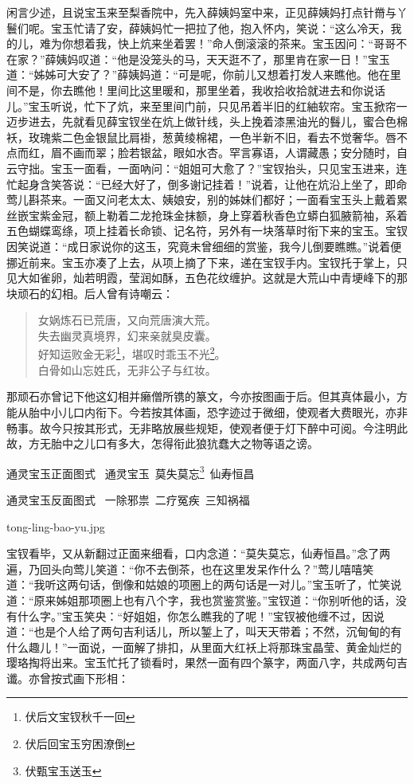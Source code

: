\documentclass[12pt,oneside]{book}
\newenvironment{shici}{%
\begin{verse}%
\centering\large\hspace{12pt}}%
{\end{verse}}
\begin{document}
闲言少述，且说宝玉来至梨香院中，先入薛姨妈室中来，正见薛姨妈打点针黹与丫鬟们呢。宝玉忙请了安，薛姨妈忙一把拉了他，抱入怀内，笑说：“这么冷天，我的儿，难为你想着我，快上炕来坐着罢！”命人倒滚滚的茶来。宝玉因问：“哥哥不在家？”薛姨妈叹道：“他是没笼头的马，天天逛不了，那里肯在家一日！”宝玉道：“姊姊可大安了？”薛姨妈道：“可是呢，你前儿又想着打发人来瞧他。他在里间不是，你去瞧他！里间比这里暖和，那里坐着，我收拾收拾就进去和你说话儿。”宝玉听说，忙下了炕，来至里间门前，只见吊着半旧的红紬软帘。宝玉掀帘一迈步进去，先就看见薛宝钗坐在炕上做针线，头上挽着漆黑油光的䰖儿，蜜合色棉袄，玫瑰紫二色金银鼠比肩褂，葱黄绫棉裙，一色半新不旧，看去不觉奢华。唇不点而红，眉不画而翠；脸若银盆，眼如水杏。罕言寡语，人谓藏愚；安分随时，自云守拙。宝玉一面看，一面吶问：“姐姐可大愈了？”宝钗抬头，只见宝玉进来，连忙起身含笑答说：“已经大好了，倒多谢记挂着！”说着，让他在炕沿上坐了，即命莺儿斟茶来。一面又问老太太、姨娘安，别的姊妹们都好；一面看宝玉头上戴着累丝嵌宝紫金冠，额上勒着二龙抢珠金抹额，身上穿着秋香色立蟒白狐腋箭袖，系着五色蝴蝶鸾绦，项上挂着长命锁、记名符，另外有一块落草时衔下来的宝玉。宝钗因笑说道：“成日家说你的这玉，究竟未曾细细的赏鉴，我今儿倒要瞧瞧。”说着便挪近前来。宝玉亦凑了上去，从项上摘了下来，递在宝钗手内。宝钗托于掌上，只见大如雀卵，灿若明霞，莹润如酥，五色花纹缠护。这就是大荒山中青埂峰下的那块顽石的幻相。后人曾有诗嘲云：

\begin{shici}
女娲炼石已荒唐，又向荒唐演大荒。\\
失去幽灵真境界，幻来亲就臭皮囊。\\
好知运败金无彩\footnote{伏后文宝钗秋千一回}，堪叹时乖玉不光\footnote{伏后回宝玉穷困潦倒}。\\
白骨如山忘姓氏，无非公子与红妆。
\end{shici}


那顽石亦曾记下他这幻相并癞僧所镌的篆文，今亦按图画于后。但其真体最小，方能从胎中小儿口内衔下。今若按其体画，恐字迹过于微细，使观者大费眼光，亦非畅事。故今只按其形式，无非略放展些规矩，使观者便于灯下醉中可阅。今注明此故，方无胎中之儿口有多大，怎得衔此狼犺蠢大之物等语之谤。

通灵宝玉正面图式  ~通灵宝玉~莫失莫忘\footnote{伏甄宝玉送玉}~仙寿恒昌

通灵宝玉反面图式  ~一除邪祟~二疗冤疾~三知祸福
 
\begin{fig}{tong-ling-bao-yu.jpg}
\label{fig:tong-ling-bao-yu}
\end{fig}

宝钗看毕，又从新翻过正面来细看，口内念道：“莫失莫忘，仙寿恒昌。”念了两遍，乃回头向莺儿笑道：“你不去倒茶，也在这里发呆作什么？”莺儿嘻嘻笑道：“我听这两句话，倒像和姑娘的项圈上的两句话是一对儿。”宝玉听了，忙笑说道：“原来姊姐那项圈上也有八个字，我也赏鉴赏鉴。”宝钗道：“你别听他的话，没有什么字。”宝玉笑央：“好姐姐，你怎么瞧我的了呢！”宝钗被他缠不过，因说道：“也是个人给了两句吉利话儿，所以錾上了，叫天天带着；不然，沉甸甸的有什么趣儿！”一面说，一面解了排扣，从里面大红袄上将那珠宝晶莹、黄金灿烂的璎珞掏将出来。宝玉忙托了锁看时，果然一面有四个篆字，两面八字，共成两句吉谶。亦曾按式画下形相：
\end{document}
